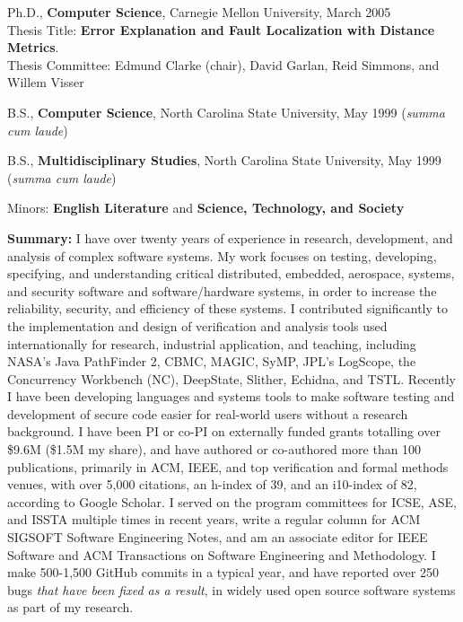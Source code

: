 \documentclass[ComputerScience]{vita}
\begin{document}
\begin{vita}


\begin{Education}
  \item Ph.D., {\bf Computer Science}, Carnegie Mellon University, March 2005\\ Thesis Title:  {\bf Error Explanation and Fault Localization with Distance Metrics}.\\Thesis Committee:  Edmund Clarke (chair), David Garlan, Reid Simmons, and Willem Visser

  \item B.S., {\bf Computer Science}, North Carolina State University, May 1999 (\emph{summa cum laude})
  \item B.S., {\bf Multidisciplinary Studies}, North Carolina State University, May 1999 (\emph{summa cum laude})
\item  \hspace{0.5in} Minors:  {\bf English Literature} and {\bf Science, Technology, and Society}
\end{Education}

\begin{Experience}
\item {\bf Summary:} I have over twenty years of experience in
  research, development, and analysis of complex software systems.  My
  work focuses on testing, developing, specifying, and understanding
  critical distributed, embedded, aerospace, systems, and security
  software and software/hardware systems, in order to increase the
  reliability, security, and efficiency of these systems.  I
  contributed significantly to the implementation and design of
  verification and analysis tools used internationally for research,
  industrial application, and teaching, including NASA's Java
  PathFinder 2, CBMC, MAGIC, SyMP, JPL's LogScope, the Concurrency
  Workbench (NC), DeepState, Slither, Echidna, and TSTL.  Recently I have been developing languages
  and systems tools to make software testing and development of secure
  code easier for real-world users without a research background.
  I have been PI or co-PI on externally funded grants totalling over
  \$9.6M (\$1.5M my share), and have authored or co-authored more than
  100 publications, primarily in ACM, IEEE, and top verification and
  formal methods venues, with over 5,000 citations, an h-index of 39,
  and an i10-index of 82, according to Google Scholar.  I served on
  the program committees for ICSE, ASE, and ISSTA multiple times in
  recent years, write a regular column for ACM SIGSOFT Software
  Engineering Notes, and am an associate editor for IEEE Software and ACM Transactions on Software Engineering and Methodology.  I make 500-1,500 GitHub commits in a typical
  year, and have reported over 250 bugs \emph{that have been fixed as a result}, in widely used open source
  software systems as part of my research.


\end{Experience}
\end{vita}
\end{document}
